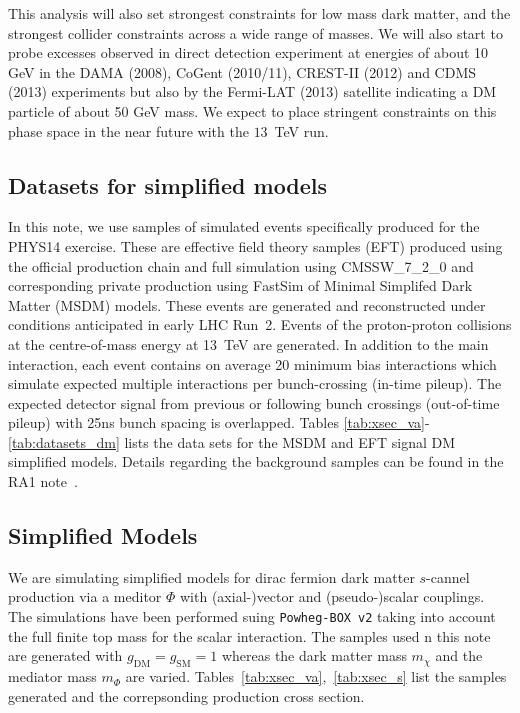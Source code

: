 This analysis will also set strongest constraints for low mass dark matter, and the strongest collider constraints across a wide range of masses. We will also start to probe excesses observed in direct detection experiment at energies of about 10 GeV in the DAMA (2008), CoGent (2010/11), CREST-II (2012) and CDMS (2013) experiments but also by the Fermi-LAT (2013) satellite indicating a DM particle of about 50 GeV mass. We expect to place stringent constraints on this phase space in the near future with the $13$~TeV run.



\subsection{Datasets for simplified models}

In this note, we use samples of simulated events specifically produced
for the PHYS14 exercise. These are effective field theory samples (EFT) produced using the official production chain and full simulation using {\textsc CMSSW\_7\_2\_0}
and corresponding private production using {\textsc FastSim} of Minimal Simplifed Dark Matter (MSDM) models. These events are generated and reconstructed
under conditions anticipated in early LHC Run~2. Events of the proton-proton collisions at the centre-of-mass energy at 13~TeV are
generated. In addition to the main interaction, each event contains on average 20 minimum bias interactions which simulate expected multiple
interactions per bunch-crossing (in-time pileup). The expected detector signal from previous or following bunch crossings (out-of-time pileup)
with 25ns bunch spacing is overlapped.
Tables \ref{tab:xsec_va}-\ref{tab:datasets_dm} lists the data sets for the MSDM and EFT signal DM simplified models. Details regarding the background samples can be found in the RA1 note~\cite{CMS_AN-15-004}.



\subsection{Simplified Models}

We are simulating simplified models for dirac fermion dark matter $s$-cannel production via a meditor $\Phi$ with (axial-)vector and (pseudo-)scalar couplings. The simulations
have been performed suing {\tt Powheg-BOX v2} taking into account the full finite top mass for the scalar interaction. The samples used n this note are generated with $g_{\textrm{DM}}=g_{\textrm{SM}}=1$ whereas the dark matter mass $m_{\chi}$ and the mediator mass $m_{\Phi}$ are varied. Tables~\ref{tab:xsec_va},~\ref{tab:xsec_s} list the samples generated and the correpsonding production cross section.


